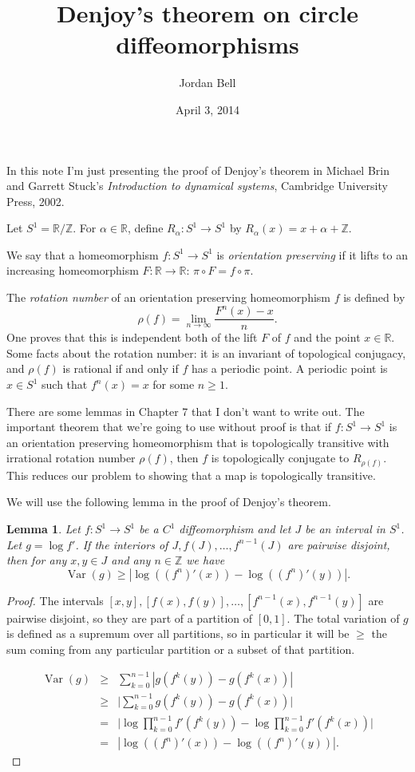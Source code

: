 \documentclass{article}
\newtheorem{lemma}[theorem]{Lemma}
\newcommand{\Var}[0]{\operatorname{Var}}
\begin{document}
\title{Denjoy's theorem on circle diffeomorphisms}
\author{Jordan Bell}
\date{April 3, 2014}
\maketitle

In this note I'm just presenting the proof of Denjoy's theorem in Michael Brin and Garrett Stuck's {\em Introduction
to dynamical systems}, Cambridge University Press, 2002. 

Let $S^1=\mathbb{R}/\mathbb{Z}$. For $\alpha \in \mathbb{R}$, define $R_\alpha:S^1 \to S^1$ by $R_\alpha(x)=x+\alpha
+\mathbb{Z}$.

We say that a homeomorphism $f:S^1 \to S^1$ is {\em orientation preserving} if it lifts to an increasing homeomorphism
$F:\mathbb{R} \to \mathbb{R}$: $\pi \circ F=f \circ \pi$.

The {\em rotation number} of an orientation preserving homeomorphism $f$ is defined by
\[
\rho(f)=\lim_{n \to \infty} \frac{F^n(x)-x}{n}.
\]
One proves that this is independent both of the lift $F$ of $f$ and the point $x \in \mathbb{R}$.
Some facts about the rotation number: it is an invariant of topological conjugacy, and $\rho(f)$ is rational if and only
if $f$ has a periodic point. A periodic point is $x \in S^1$ such that $f^n(x)=x$ for some $n \geq 1$.

There are some lemmas in Chapter 7 that I don't want to write out. The important theorem that
we're going to use without proof
is that if $f:S^1 \to S^1$ is an orientation preserving homeomorphism that is topologically
transitive with irrational rotation
number $\rho(f)$, then $f$ is topologically conjugate to $R_{\rho(f)}$. 
This reduces our problem to showing that a map is topologically transitive.

We will use the following lemma in the proof of Denjoy's theorem.

\begin{lemma}
Let $f:S^1 \to S^1$ be a $C^1$ diffeomorphism and
let $J$ be an interval in $S^1$. Let $g=\log f'$. If the interiors of $J,f(J),\ldots,f^{n-1}(J)$ are pairwise
disjoint, then for any $x, y \in J$ and any $n \in \mathbb{Z}$ we have
\[
\Var(g) \geq |\log((f^n)'(x))-\log((f^n)'(y))|.
\]
\end{lemma}
\begin{proof}
The intervals $[x,y], [f(x),f(y)], \ldots, [f^{n-1}(x),f^{n-1}(y)]$ are pairwise disjoint, so
they are part of a partition of $[0,1]$. The total variation of $g$ is defined as a supremum
over all partitions, so in particular it will be $\geq$ the sum coming from any particular
partition or a subset of that partition.

\begin{eqnarray*}
\Var(g)&\geq&\sum_{k=0}^{n-1} |g(f^k(y))-g(f^k(x))|\\
&\geq&\Big| \sum_{k=0}^{n-1} g(f^k(y))-g(f^k(x)) \Big|\\
&=&\Big| \log \prod_{k=0}^{n-1} f'(f^k(y))-\log \prod_{k=0}^{n-1} f'(f^k(x)) \Big|\\
&=&|\log((f^n)'(x))-\log((f^n)'(y))|.
\end{eqnarray*}
\end{proof}
\end{document}
